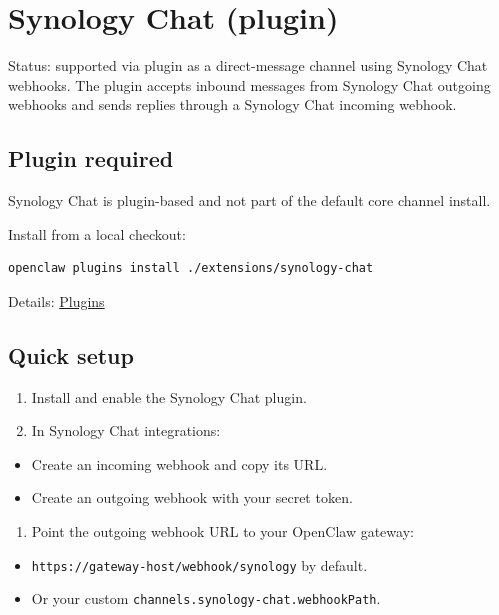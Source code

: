 \clearpage

\section{Synology Chat (plugin)}


Status: supported via plugin as a direct-message channel using Synology Chat webhooks.
The plugin accepts inbound messages from Synology Chat outgoing webhooks and sends replies
through a Synology Chat incoming webhook.

\subsection{Plugin required}


Synology Chat is plugin-based and not part of the default core channel install.

Install from a local checkout:

\begin{lstlisting}[language=bash]
openclaw plugins install ./extensions/synology-chat
\end{lstlisting}


Details: \href{/tools/plugin}{Plugins}

\subsection{Quick setup}


\begin{enumerate}
  \item Install and enable the Synology Chat plugin.
  \item In Synology Chat integrations:
\end{enumerate}

\begin{itemize}
  \item Create an incoming webhook and copy its URL.
  \item Create an outgoing webhook with your secret token.
\end{itemize}

\begin{enumerate}
  \item Point the outgoing webhook URL to your OpenClaw gateway:
\end{enumerate}

\begin{itemize}
  \item \texttt{https://gateway-host/webhook/synology} by default.
  \item Or your custom \texttt{channels.synology-chat.webhookPath}.
\end{itemize}

